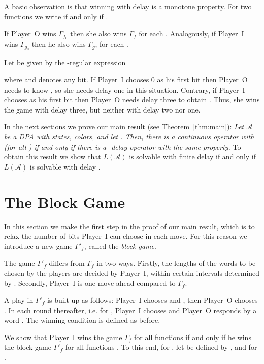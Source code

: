 \documentclass[fleqn,envcountsame]{LMCS}
\newcommand{\aut}[1]{\ensuremath{\mathcal{#1}}}
\newcommand{\pI}{Player~I\xspace}
\newcommand{\pO}{Player~O\xspace}
\newcommand{\Gd}[1]{\ensuremath{\Gamma_{#1}}\xspace}
\newcommand{\Gp}[1]{\ensuremath{\Gamma'_{#1}}\xspace}
\newcommand{\LA}{\ensuremath{L(\aut{A})}\xspace}
\newcommand{\ie}{i.e.\xspace}
\begin{document}
A basic observation is that winning with delay is a monotone property.
For two functions  we write
 if and only if .
\begin{rem}\label{rem:winning_monotone}
If \pO wins \Gd{f_0} then she also wins \Gd{f} for each .
Analogously, if \pI wins \Gd{g_0} then he also wins \Gd{g},
for each .
\end{rem}

\begin{exa}\label{ex:game_with_delay}
Let  be given by the -regular expression

where  and  denotes any bit.
If \pI chooses 0 as his first bit then \pO needs to know ,
so she needs delay one in this situation.
Contrary, if \pI chooses  as his first bit then \pO needs delay three
to obtain . Thus, she wins the game with delay three,
but neither with delay two nor one.
\end{exa}

In the next sections we prove our main result (see Theorem~\ref{thm:main}):
\emph{Let \aut{A} be a DPA
with  states,  colors, and let .
Then, there is a continuous operator 
with  (for all )
if and only if there is a -delay operator with the same property.}
To obtain this result we show that
\LA is solvable with finite delay
if and only if \LA is solvable with delay .



\section{The Block Game}\label{sec:block_game}
In this section we make the first step in the proof of our main result,
which is to relax the number of bits \pI can choose in each move.
For this reason we introduce a new game \Gp{f}, called the \emph{block game}.

The game \Gp{f} differs from \Gd{f} in two ways.
Firstly, the lengths of the words to be chosen by the players
are decided by \pI, within certain intervals determined by .
Secondly, \pI is one move ahead compared to \Gd{f}.

A play in \Gp{f} is built up as follows: \pI chooses
 and ,
then \pO chooses .
In each round thereafter, \ie for , \pI chooses
 and \pO responds
by a word .
The winning condition is defined as before.

We show that \pI wins the game \Gd{f} for all functions  if and only
if he wins the block game \Gp{f} for all functions . To this end, for
, let  be defined by
, and  for .
\end{document}
